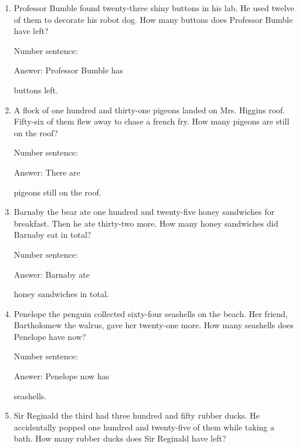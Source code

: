 \documentclass{tufte-book}
\begin{document}
\begin{enumerate}

\item
  Professor Bumble found twenty-three shiny buttons in his lab. He used
  twelve of them to decorate his robot dog. How many buttons does
  Professor Bumble have left?\medskip\par
  Number sentence:
  \dotfill\medskip\par
  Answer: Professor Bumble has
  \dotfill\medskip\par\mbox{}\dotfill\medskip\par\mbox{}\dotfill\bigskip
  buttons left.
\item
  A flock of one hundred and thirty-one pigeons landed on Mrs.
  Higgins\textquotesingle{} roof. Fifty-six of them flew away to chase a
  french fry. How many pigeons are still on the roof?\medskip\par
  Number sentence:
  \dotfill\medskip\par
  Answer: There are
  \dotfill\medskip\par\mbox{}\dotfill\medskip\par\mbox{}\dotfill\bigskip
  pigeons still on the roof.
\item
  Barnaby the bear ate one hundred and twenty-five honey sandwiches for
  breakfast. Then he ate thirty-two more. How many honey sandwiches did
  Barnaby eat in total?\medskip\par
  Number sentence:
  \dotfill\medskip\par
  Answer: Barnaby ate
  \dotfill\medskip\par\mbox{}\dotfill\medskip\par\mbox{}\dotfill\bigskip
  honey sandwiches in total.
\item
  Penelope the penguin collected sixty-four seashells on the beach. Her
  friend, Bartholomew the walrus, gave her twenty-one more. How many
  seashells does Penelope have now?\medskip\par
  Number sentence:
  \dotfill\medskip\par
  Answer: Penelope now has
  \dotfill\medskip\par\mbox{}\dotfill\medskip\par\mbox{}\dotfill\bigskip
  seashells.
\item
  Sir Reginald the third had three hundred and fifty rubber ducks. He
  accidentally popped one hundred and twenty-five of them while taking a
  bath. How many rubber ducks does Sir Reginald have left?\medskip\par

\end{enumerate}
\end{document}
